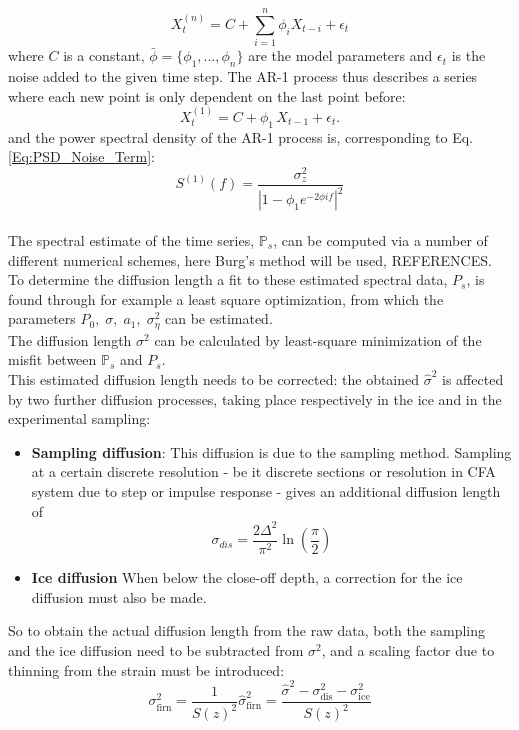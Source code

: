 \documentclass[../../CompleteThesis/Complete_1stDraft.tex]{subfiles}
\begin{document}
\begin{equation}
	X_t^{(n)} = C + \sum_{i=1}^{n}\phi_i X_{t-i} + \epsilon_t
	\label{Eq:AR-n}
\end{equation}
where $C$ is a constant, $\bar{\phi} = \{\phi_1,...,\phi_{n}\}$ are the model parameters and $\epsilon_t$ is the noise added to the given time step. The AR-1 process thus describes a series where each new point is only dependent on the last point before:
\begin{equation}
	X_t^{(1)} = C + \phi_{1}\, X_{t-1} + \epsilon_t.
	\label{Eq:AR-1}
\end{equation} 
and the power spectral density of the AR-1 process is, corresponding to Eq. \ref{Eq:PSD_Noise_Term}:
\begin{equation}
	S^{(1)}(f) = \frac{\sigma_z^2}{|1 - \phi_{1}e^{-2\phi i f}|^2}
\end{equation}\\
The spectral estimate of the time series, $\mathbb{P}_s$, can be computed via a number of different numerical schemes, here Burg's method will be used, REFERENCES. To determine the diffusion length a fit to these estimated spectral data, $P_s$, is found through for example a least square optimization, from which the parameters $P_0, \; \sigma, \; a_1, \; \sigma_{\eta}^2$ can be estimated.\\
The diffusion length $\sigma^2$ can be calculated by least-square minimization of the misfit between $\mathbb{P}_s$ and $P_s$.\\
This estimated diffusion length needs to be corrected: the obtained $\hat{\sigma}^2$ is affected by two further diffusion processes, taking place respectively in the ice and in the experimental sampling:
\begin{itemize}
	\item \textbf{Sampling diffusion}: This diffusion is due to the sampling method. Sampling at a certain discrete resolution - be it discrete sections or resolution in CFA system due to step or impulse response - gives an additional diffusion length of
	\begin{equation}
		\sigma_{dis} = \frac{2 \Delta^2}{\pi^2}\ln\left(\frac{\pi}{2}\right)
		\label{Eq:Diff_Len_corr_Discrete}
	\end{equation}
	\item \textbf{Ice diffusion} When below the close-off depth, a correction for the ice diffusion must also be made.
\end{itemize} 

So to obtain the actual diffusion length from the raw data, both the sampling and the ice diffusion need to be subtracted from $\sigma^2$, and a scaling factor due to thinning from the strain must be introduced:
\begin{equation}
	\sigma_{\text{firn}}^2 = \frac{1}{S(z)^2}\hat{\sigma}_{\text{firn}}^2 = \frac{\hat{\sigma}^2 - \sigma_{\text{dis}}^2 - \sigma_{\text{ice}}^2}{S(z)^2}
	\label{Eq:Diff_Len_Firn_Corrected}
\end{equation}
\end{document}
